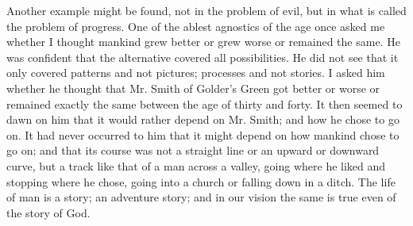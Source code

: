 Another example might be found, not in the problem of evil, but in what is called the problem of progress. One of the ablest agnostics of the age once asked me whether I thought mankind grew better or grew worse or remained the same. He was confident that the alternative covered all possibilities. He did not see that it only covered patterns and not pictures; processes and not stories. I asked him whether he thought that Mr. Smith of Golder's Green got better or worse or remained exactly the same between the age of thirty and forty. It then seemed to dawn on him that it would rather depend on Mr. Smith; and how he chose to go on. It had never occurred to him that it might depend on how mankind chose to go on; and that its course was not a straight line or an upward or downward curve, but a track like that of a man across a valley, going where he liked and stopping where he chose, going into a church or falling down in a ditch. The life of man is a story; an adventure story; and in our vision the same is true even of the story of God.


